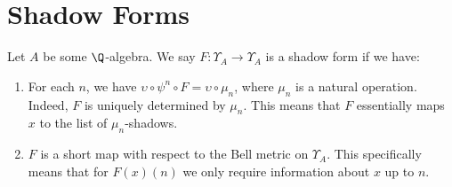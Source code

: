\section{Shadow Forms}

\begin{definition}
  Let $A$ be some $\Q$-algebra. We say $F : \Upsilon_A \to \Upsilon_A$ is a shadow form if we have:
  \begin{enumerate}
    \item For each $n$, we have $\upsilon \circ \psi^n \circ F = \upsilon \circ \mu_n$, where $\mu_n$ is a natural operation. Indeed, $F$ is uniquely determined by $\mu_n$. This means that $F$ essentially maps $x$ to the list of $\mu_n$-shadows.
    \item $F$ is a short map with respect to the Bell metric on $\Upsilon_A$. This specifically means that for $F(x)(n)$ we only require information about $x$ up to $n$. 
  \end{enumerate}
\end{definition}
